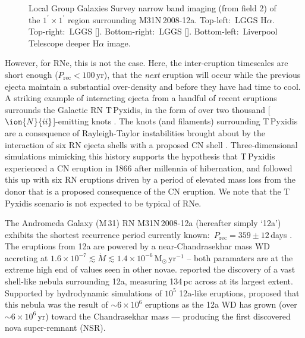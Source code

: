 \documentclass[fleqn,usenatbib]{mnras}
\begin{document}
\begin{figure}
\caption{Local Group Galaxies Survey \citep[LGGS;][]{2007AJ....134.2474M} narrow band imaging (from field 2) of the $1^\prime\times1^\prime$ region surrounding M31N\,2008-12a. Top-left:\ LGGS H$\alpha$. Top-right:\ LGGS []. Bottom-right:\ LGGS []. Bottom-left:\ Liverpool Telescope deeper H$\alpha$ image.}
\label{12a NSR images}
\end{figure}

However, for RNe, this is not the case. Here, the inter-eruption timescales are short enough ($P_\mathrm{rec}<100$\,yr), that the \textit{next} eruption will occur while the previous ejecta maintain a substantial over-density and before they have had time to cool. A striking example of interacting ejecta from a handful of recent eruptions surrounds the Galactic RN T\,Pyxidis, in the form of over two thousand [$\ion{N}{ii}$]-emitting knots \citep{1997AJ....114..258S,2015ApJ...805..148S}. The knots (and filaments) surrounding T\,Pyxidis are a consequence of Rayleigh-Taylor instabilities brought about by the interaction of six RN ejecta shells with a proposed CN shell \citep{2013ApJ...768...48T,2015ApJ...805..148S}. Three-dimensional simulations mimicking this history \citep{2013ApJ...768...48T} supports the \citet{2010ApJ...708..381S} hypothesis that T\,Pyxidis experienced a CN eruption in 1866 after millennia of hibernation, and followed this up with six RN eruptions driven by a period of elevated mass loss from the donor that is a proposed consequence of the CN eruption. We note that the T\,Pyxidis scenario is not expected to be typical of RNe.

The Andromeda Galaxy (M\,31) RN M31N\,2008-12a (hereafter simply `12a') exhibits the shortest recurrence period currently known:\ $P_\mathrm{rec}=359\pm12$\,days \citep{2014A&A...563L...9D,2016ApJ...833..149D}. The eruptions from 12a are powered by a near-Chandrasekhar mass \citep[$M_\mathrm{WD}\simeq1.38\,\mathrm{M}_\odot$;][]{2015ApJ...808...52K} WD accreting at $1.6\times10^{-7}\lesssim\dot{M}\lesssim1.4\times10^{-6}\,\mathrm{M}_\odot\,\mathrm{yr}^{-1}$ \citep{2017ApJ...849...96D} -- both paramaters are at the extreme high end of values seen in other novae. \citet{2015A&A...580A..45D} reported the discovery of a vast shell-like nebula surrounding 12a, measuring 134\,pc across at its largest extent. Supported by hydrodynamic simulations of $10^{5}$ 12a-like eruptions, \citet{2019Natur.565..460D} proposed that this nebula was the result of ${\sim}6\times10^{6}$ eruptions as the 12a WD has grown (over ${\sim}6\times10^{6}$\,yr) toward the Chandrasekhar mass --- producing the first discovered nova super-remnant (NSR).
\end{document}
